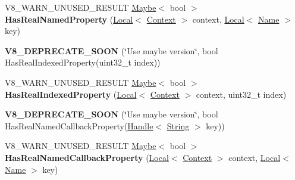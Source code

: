 \begin{DoxyCompactItemize}
\item 
\hypertarget{classv8_1_1_object_ad830b937c7586fe2086b288ea79935c4}{}V8\+\_\+\+W\+A\+R\+N\+\_\+\+U\+N\+U\+S\+E\+D\+\_\+\+R\+E\+S\+U\+L\+T \hyperlink{classv8_1_1_maybe}{Maybe}$<$ bool $>$ {\bfseries Has\+Real\+Named\+Property} (\hyperlink{classv8_1_1_local}{Local}$<$ \hyperlink{classv8_1_1_context}{Context} $>$ context, \hyperlink{classv8_1_1_local}{Local}$<$ \hyperlink{classv8_1_1_name}{Name} $>$ key)\label{classv8_1_1_object_ad830b937c7586fe2086b288ea79935c4}

\item 
\hypertarget{classv8_1_1_object_abd04e5cb82426a70ebea6afec8687c9e}{}{\bfseries V8\+\_\+\+D\+E\+P\+R\+E\+C\+A\+T\+E\+\_\+\+S\+O\+O\+N} (\char`\"{}Use maybe version\char`\"{}, bool Has\+Real\+Indexed\+Property(uint32\+\_\+t index))\label{classv8_1_1_object_abd04e5cb82426a70ebea6afec8687c9e}

\item 
\hypertarget{classv8_1_1_object_a46de2f348f4caafca287328ce385ab56}{}V8\+\_\+\+W\+A\+R\+N\+\_\+\+U\+N\+U\+S\+E\+D\+\_\+\+R\+E\+S\+U\+L\+T \hyperlink{classv8_1_1_maybe}{Maybe}$<$ bool $>$ {\bfseries Has\+Real\+Indexed\+Property} (\hyperlink{classv8_1_1_local}{Local}$<$ \hyperlink{classv8_1_1_context}{Context} $>$ context, uint32\+\_\+t index)\label{classv8_1_1_object_a46de2f348f4caafca287328ce385ab56}

\item 
\hypertarget{classv8_1_1_object_a591e6f74fd85e0c65d892af57db9084b}{}{\bfseries V8\+\_\+\+D\+E\+P\+R\+E\+C\+A\+T\+E\+\_\+\+S\+O\+O\+N} (\char`\"{}Use maybe version\char`\"{}, bool Has\+Real\+Named\+Callback\+Property(\hyperlink{classv8_1_1_local}{Handle}$<$ \hyperlink{classv8_1_1_string}{String} $>$ key))\label{classv8_1_1_object_a591e6f74fd85e0c65d892af57db9084b}

\item 
\hypertarget{classv8_1_1_object_a62bde6bea1ce32b30b2152f33a105b14}{}V8\+\_\+\+W\+A\+R\+N\+\_\+\+U\+N\+U\+S\+E\+D\+\_\+\+R\+E\+S\+U\+L\+T \hyperlink{classv8_1_1_maybe}{Maybe}$<$ bool $>$ {\bfseries Has\+Real\+Named\+Callback\+Property} (\hyperlink{classv8_1_1_local}{Local}$<$ \hyperlink{classv8_1_1_context}{Context} $>$ context, \hyperlink{classv8_1_1_local}{Local}$<$ \hyperlink{classv8_1_1_name}{Name} $>$ key)\label{classv8_1_1_object_a62bde6bea1ce32b30b2152f33a105b14}


\end{DoxyCompactItemize}
